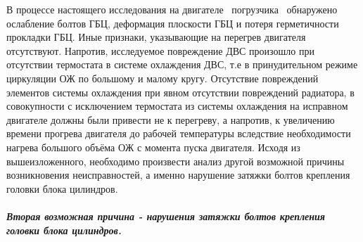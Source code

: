 В процессе настоящего исследования на двигателе \, погрузчика \, обнаружено ослабление болтов ГБЦ, деформация плоскости ГБЦ и потеря герметичности прокладки ГБЦ.  Иные признаки, указывающие на перегрев двигателя отсутствуют. Напротив, исследуемое повреждение ДВС произошло при отсутствии термостата в системе охлаждения ДВС, т.е в принудительном режиме   циркуляции ОЖ по большому и малому кругу. Отсутствие повреждений элементов системы охлаждения при явном отсутствии повреждений радиатора, в совокупности с исключением термостата из системы охлаждения на исправном двигателе должны были привести не к перегреву, а напротив,  к увеличению времени прогрева двигателя до рабочей температуры вследствие необходимости нагрева большого объёма ОЖ с момента пуска двигателя. 
Исходя  из вышеизложенного, необходимо произвести анализ другой возможной причины возникновения неисправностей, а именно нарушение затяжки болтов крепления головки блока цилиндров.   
  
\subparagraph{Вторая возможная причина - нарушения затяжки болтов крепления головки блока цилиндров.}

